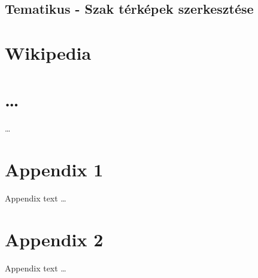 \documentclass[11pt,twoside,a4paper,final]{report}
\begin{document}
	\section{Tematikus - Szak térképek szerkesztése}
	\label{sec:tematikus,szak,szerkesztés}

\chapter{Wikipedia}
\label{ch:wiki,wikipedia}


\chapter{\ldots}
\label{ch:sample}

\ldots

   



\appendix

\chapter{Appendix 1}
\label{app:appendix1}

Appendix text \ldots

\chapter{Appendix 2}
\label{app:appendix2}

Appendix text \ldots
\end{document}
